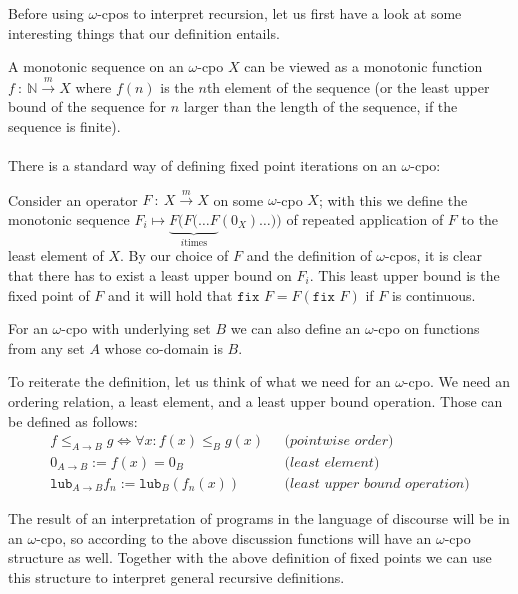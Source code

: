 \documentclass[11pt, leqno, titlepage]{article}
\theoremstyle{definition}
\begin{document}
Before using $\omega$-cpos to interpret recursion, let us first have a look at some
interesting things that our definition entails.

A monotonic sequence on an $\omega$-cpo $X$ can be viewed as a monotonic function
$f~:~\mathbb{N} \xrightarrow{m} X$ where $f(n)$ is the $n$th element of the sequence (or the
least upper bound of the sequence for $n$ larger than the length of the sequence, if the sequence is finite).\\
\\
There is a standard way of defining fixed point iterations on an $\omega$-cpo: \cite{rml-paper}

Consider an operator $F~:~X \xrightarrow{m} X$ on some $\omega$-cpo $X$; with this we
define the monotonic sequence $F_i \mapsto \underbrace{ F(F(\dots F}_{i \text{
    times}} (0_X) \dots))$ of repeated application of $F$ to the least element of $X$.
By our choice of $F$ and the definition of $\omega$-cpos, it is clear that there has
to exist a least upper bound on $F_i$. This least upper bound is the fixed point of
$F$ and it will hold that $\texttt{fix } F = F(\texttt{fix }F)$ if $F$ is
continuous. 

For an $\omega$-cpo with underlying set $B$ we can also define an $\omega$-cpo on
functions from any set $A$ whose co-domain is $B$.

To reiterate the definition, let us think of what we need for an $\omega$-cpo. We
need an ordering relation, a least element, and a least upper bound operation. Those
can be defined as follows:
\begin{align*}
  f\leq_{A \to B} g \Leftrightarrow \forall x: f(x) \leq_B g(x) & ~~~\textit{(pointwise order)}\\
  0_{A\to B} := f(x) = 0_B & ~~~\textit{(least element)}\\
  \texttt{lub}_{A\to B} f_n := \texttt{lub}_B(f_n(x)) & ~~~\textit{(least upper
                                                               bound operation)}
\end{align*}


The result of an interpretation of programs in the language of discourse will be in
an $\omega$-cpo, so according to the above discussion functions will have an
$\omega$-cpo structure as well. Together with the above definition of fixed points we
can use this structure to interpret general recursive definitions. 
\end{document}
